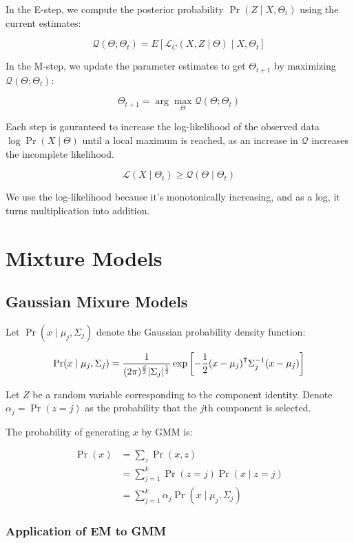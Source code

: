 \documentclass{idc_msc}
\renewcommand{\T}{{\mathpalette\raiseT\intercal}} %
\begin{document}
In the E-step, we compute the posterior probability \(\Pr(Z \mid X, \Theta_t)\) using the current estimates:

\[\mathcal{Q}(\Theta; \Theta_t) = E[\mathcal{L}_C(X, Z \mid \Theta)\mid X, \Theta_t]\]

In the M-step, we update the parameter estimates to get \(\Theta_{t + 1}\) by maximizing \(\mathcal{Q}(\Theta; \Theta_t)\):

\[\Theta_{t+1} = \arg \max_\Theta \mathcal{Q}(\Theta; \Theta_t)\]

Each step is gauranteed to increase the log-likelihood of the observed data \(\log \Pr(X \mid \Theta)\) until a local maximum is reached, as an increase in \(\mathcal{Q}\) increases the incomplete likelihood.

\[\mathcal{L}(X \mid \Theta_t) \ge \mathcal{Q}(\Theta \mid \Theta_t)\]

We use the log-likelihood because it's monotonically increasing, and as a log, it turns multiplication into addition.

\section{Mixture Models}

\subsection{Gaussian Mixure Models}

Let \(\Pr(x \mid \mu_j, \Sigma_j)\) denote the Gaussian probability density function:

\[\Pr(x \mid \mu_j, \Sigma_j) = \frac{1}{(2\pi)^\frac{d}{2}|\Sigma_j|^{\frac{1}{2}}} \exp\left[- \frac{1}{2}(x - \mu_j)^\T \Sigma_j^{-1}(x - \mu_j)\right]\]

Let \(Z\) be a random variable corresponding to the component identity.
Denote \(\alpha_j = \Pr(z = j)\) as the probability that the \(j\)th component is selected.

The probability of generating \(x\) by GMM is:

\[
\begin{aligned}
  \Pr(x) &= \sum_z \Pr(x, z) \\
  &= \sum_{j=1}^k \Pr(z = j) \Pr(x \mid z = j) \\
  &= \sum_{j=1}^k \alpha_j \Pr(x \mid \mu_j, \Sigma_j)
\end{aligned}
\]

\subsubsection{Application of EM to GMM}
\end{document}
